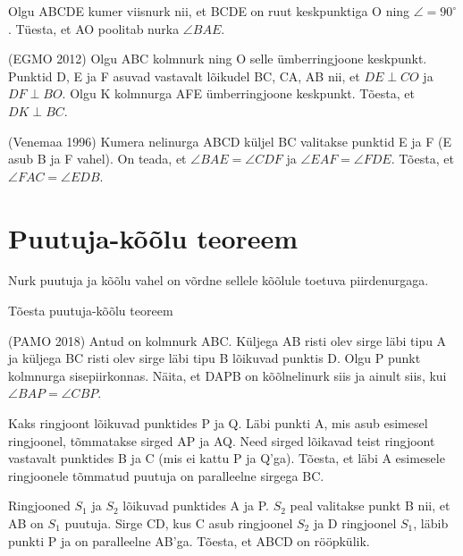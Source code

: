 \documentclass[a4paper,11pt,twocolumn]{article}
\begin{document}
\begin{question}
	Olgu ABCDE kumer viisnurk nii, et BCDE on ruut keskpunktiga O ning $\angle=90^\circ$. Tüesta, et AO poolitab nurka $\angle BAE$.
\end{question}

\begin{question}
	(EGMO 2012) Olgu ABC kolmnurk ning O selle ümberringjoone keskpunkt. Punktid D, E ja F asuvad vastavalt lõikudel BC, CA, AB nii, et $DE\perp CO$ ja $DF \perp BO$. Olgu K kolmnurga AFE ümberringjoone keskpunkt. Tõesta, et $DK \perp BC$.
\end{question}

\begin{question}
	(Venemaa 1996) Kumera nelinurga ABCD küljel BC valitakse punktid E ja F (E asub B ja F vahel). On teada, et $\angle BAE = \angle CDF$ ja $\angle EAF = \angle FDE$. Tõesta, et $\angle FAC = \angle EDB$.
\end{question}

\section{Puutuja-kõõlu teoreem}

Nurk puutuja ja kõõlu vahel on võrdne sellele kõõlule toetuva piirdenurgaga.

\begin{question}
	Tõesta puutuja-kõõlu teoreem
\end{question}

\begin{question}
	(PAMO 2018) Antud on kolmnurk ABC. Küljega AB risti olev sirge läbi tipu A ja küljega BC risti olev sirge läbi tipu B lõikuvad punktis D. Olgu P punkt kolmnurga sisepiirkonnas. Näita, et DAPB on kõõlnelinurk siis ja ainult siis, kui $\angle BAP = \angle CBP$.
\end{question}

\begin{question}
	Kaks ringjoont lõikuvad punktides P ja Q. Läbi punkti A, mis asub esimesel ringjoonel, tõmmatakse sirged AP ja AQ. Need sirged lõikavad teist ringjoont vastavalt punktides B ja C (mis ei kattu P ja Q'ga). Tõesta, et läbi A esimesele ringjoonele tõmmatud puutuja on paralleelne sirgega BC. 
\end{question}

\begin{question}
	Ringjooned $S_1$ ja $S_2$ lõikuvad punktides A ja P. $S_2$ peal valitakse punkt B nii, et AB on $S_1$ puutuja. Sirge CD, kus C asub ringjoonel $S_2$ ja D ringjoonel $S_1$, läbib punkti P ja on paralleelne AB'ga. Tõesta, et ABCD on rööpkülik.
\end{question}
\end{document}
